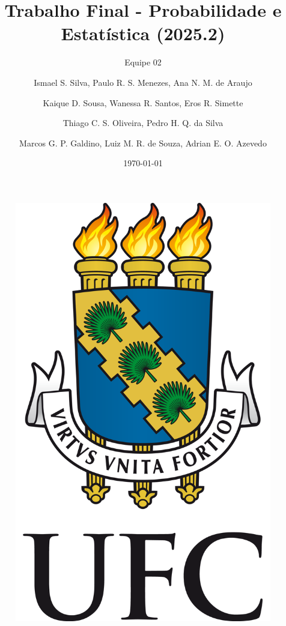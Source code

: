 \documentclass[serif, aspectratio=169]{beamer}
\title{Trabalho Final - Probabilidade e Estatística (2025.2)}
\subtitle{Equipe 02}
\author{
Ismael S. Silva, Paulo R. S. Menezes, Ana N. M. de Araujo\and
Kaique D. Sousa, Wanessa R. Santos, Eros R. Simette\and
Thiago C. S. Oliveira, Pedro H. Q. da Silva\and
Marcos G. P. Galdino, Luiz M. R. de Souza, Adrian E. O. Azevedo
}
\institute{Universidade Federal do Ceará}
\date{\small \today}
\begin{document}
\begin{frame}
    \titlepage
    \vspace*{-0.6cm}
    \begin{figure}[htpb]
        \begin{center}
            \includegraphics[keepaspectratio, scale=0.06]{figures/UFC.png}
        \end{center}
    \end{figure}
\end{frame}

\begin{frame}    
\tableofcontents[sectionstyle=show,
subsectionstyle=show/shaded/hide,
subsubsectionstyle=show/shaded/hide]
\end{frame}
\end{document}
